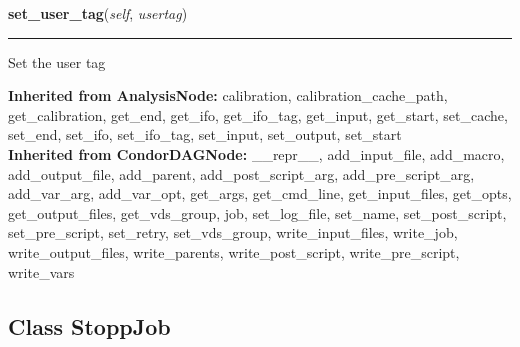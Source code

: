    \label{stochastic:StochasticNode:set_user_tag}
    \vspace{0.5ex}

    \begin{boxedminipage}{\textwidth}

    \raggedright \textbf{set\_user\_tag}(\textit{self}, \textit{usertag})

    \vspace{-1.5ex}

    \rule{\textwidth}{0.5\fboxrule}
    Set the user tag

    \vspace{1ex}

    \end{boxedminipage}

  \textbf{Inherited from AnalysisNode:}
    calibration,
    calibration\_cache\_path,
    get\_calibration,
    get\_end,
    get\_ifo,
    get\_ifo\_tag,
    get\_input,
    get\_start,
    set\_cache,
    set\_end,
    set\_ifo,
    set\_ifo\_tag,
    set\_input,
    set\_output,
    set\_start
    \\
  \textbf{Inherited from CondorDAGNode:}
    \_\_repr\_\_,
    add\_input\_file,
    add\_macro,
    add\_output\_file,
    add\_parent,
    add\_post\_script\_arg,
    add\_pre\_script\_arg,
    add\_var\_arg,
    add\_var\_opt,
    get\_args,
    get\_cmd\_line,
    get\_input\_files,
    get\_opts,
    get\_output\_files,
    get\_vds\_group,
    job,
    set\_log\_file,
    set\_name,
    set\_post\_script,
    set\_pre\_script,
    set\_retry,
    set\_vds\_group,
    write\_input\_files,
    write\_job,
    write\_output\_files,
    write\_parents,
    write\_post\_script,
    write\_pre\_script,
    write\_vars


\subsection{Class StoppJob}

